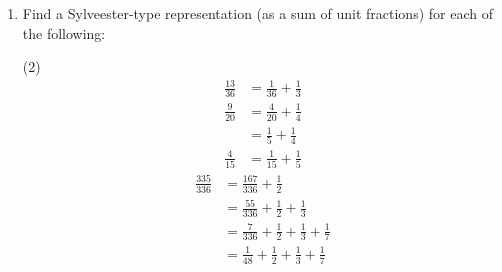 \documentclass[12pt]{article}
\begin{document}
\begin{enumerate}[label=\arabic*.]
    \item Find a Sylveester-type representation (as a sum of unit fractions) for each of the following:
    \begin{tasks}[label=\alph*.] (2)
        \task\begin{align*}
            \frac{13}{36} &= \frac{1}{36} + \frac{1}{3}
        \end{align*}
        \task\begin{align*}
            \frac{9}{20} &= \frac{4}{20} + \frac{1}{4} \\
            &= \frac{1}{5} + \frac{1}{4}
        \end{align*}
        \task\begin{align*}
            \frac{4}{15} &= \frac{1}{15} + \frac{1}{5}
        \end{align*}
        \task\begin{align*}
            \frac{335}{336} &= \frac{167}{336} + \frac{1}{2} \\
            &= \frac{55}{336} + \frac{1}{2} + \frac{1}{3} \\
            &= \frac{7}{336} + \frac{1}{2} + \frac{1}{3} + \frac{1}{7} \\
            &= \frac{1}{48} + \frac{1}{2} + \frac{1}{3} + \frac{1}{7} 
        \end{align*}
    \end{tasks} 
\end{enumerate}
\end{document}
